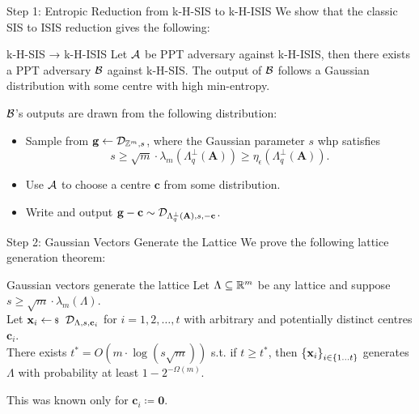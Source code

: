 \documentclass[xcolor=table,10pt,aspectratio=169]{beamer}
\renewcommand{\vec}[1]{\ensuremath{\mathbf{#1}}\xspace}
\providecommand{\mat}[1]{\ensuremath{\vec{#1}}\xspace}
\begin{document}
\begin{frame}[label={sec:orgb70499a}]{Step 1: Entropic Reduction from k-H-SIS to k-H-ISIS}
We show that the classic SIS to ISIS reduction gives the following:

\begin{alertblock}{k-H-SIS → k-H-ISIS}
Let \(\mathcal{A}\) be PPT adversary against k-H-ISIS, then there exists a PPT adversary \(\mathcal{B}\) against k-H-SIS. The output of \(\mathcal{B}\) follows a Gaussian distribution with some centre with high min-entropy.
\end{alertblock}

\(\mathcal{B}\)'s outputs are drawn from the following distribution:

\begin{itemize}
\item Sample from \(\vec{g} \gets \ddv_{\ZZ^m, s}\), where the Gaussian parameter \(s\) whp satisfies \[s \geq \sqrt{m} \cdot \lambda_m(\Lambda_q^\bot(\mat{A})) \geq \eta_{\epsilon}(\Lambda_q^\bot(\mat{A})).\]
\item Use \(\mathcal{A}\) to choose a centre \(\vec{c}\) from some distribution.
\item Write and output \(\vec{g} - \mathbf{c} \sim \ddv_{\Lambda_q^\bot(\mat{A}), s, -\vec{c}}\).
\end{itemize}
\end{frame}

\begin{frame}[label={sec:org4093c3d}]{Step 2: Gaussian Vectors Generate the Lattice}
We prove the following lattice generation theorem:

\begin{alertblock}{Gaussian vectors generate the lattice}
Let \(\Lambda \subseteq \mathbb{R}^m\) be any lattice and suppose \(s \geq \sqrt{m} \cdot \lambda_m(\Lambda)\).\\[0pt]
Let \(\vec{x}_i \sample \ddv_{\Lambda,s,\vec{c}_i}\) for \(i = 1,2,\ldots,t\) with arbitrary and potentially distinct centres \(\vec{c}_i\).\\[0pt]
There exists \(t^* = O(m \cdot \log(s \sqrt{m}))\) s.t. if \(t \geq t^*\), then \(\set{\vec{x}_i}_{i\in \{1 \ldots t\}}\) generates \(\Lambda\) with probability at least \(1-2^{-\Omega(m)}\).
\end{alertblock}

This was known only for \(\vec{c}_i \coloneqq \vec{0}\).
\end{frame}
\end{document}
